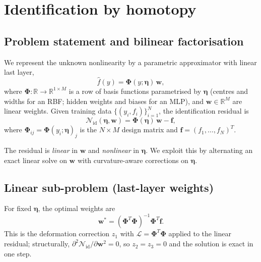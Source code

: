 \documentclass[preprint,12pt,numbers]{elsarticle}
\begin{document}
\section{Identification by homotopy}
\label{sec:identification}

\subsection{Problem statement and bilinear factorisation}

We represent the unknown nonlinearity by a parametric approximator with
linear last layer,
\begin{equation}
\hat{f}(y) = \boldsymbol{\Phi}(y;\boldsymbol{\eta})\,\mathbf{w},
\label{eq:bilinear}
\end{equation}
where $\boldsymbol{\Phi}: \mathbb{R} \to \mathbb{R}^{1\times M}$ is a row of
basis functions parametrised by $\boldsymbol{\eta}$ (centres and widths
for an RBF; hidden weights and biases for an MLP), and
$\mathbf{w} \in \mathbb{R}^M$ are linear weights. Given training data
$\{(y_i, f_i)\}_{i=1}^N$, the identification residual is
\begin{equation}
\mathcal{N}_{\mathrm{id}}(\boldsymbol{\eta}, \mathbf{w}) =
\boldsymbol{\Phi}(\boldsymbol{\eta})\,\mathbf{w} - \mathbf{f},
\label{eq:Nid}
\end{equation}
where $\boldsymbol{\Phi}_{ij} = \boldsymbol{\Phi}(y_i;\boldsymbol{\eta})_j$
is the $N \times M$ design matrix and
$\mathbf{f} = (f_1, \ldots, f_N)^T$.

The residual is \emph{linear} in $\mathbf{w}$ and \emph{nonlinear} in
$\boldsymbol{\eta}$. We exploit this by alternating an exact linear solve
on $\mathbf{w}$ with curvature-aware corrections on $\boldsymbol{\eta}$.

\subsection{Linear sub-problem (last-layer weights)}

For fixed $\boldsymbol{\eta}$, the optimal weights are
\begin{equation}
\mathbf{w}^* = (\boldsymbol{\Phi}^T\boldsymbol{\Phi})^{-1}\boldsymbol{\Phi}^T\mathbf{f}.
\label{eq:ls}
\end{equation}
This is the deformation correction $z_1$ with $\mathcal{L} = \boldsymbol{\Phi}^T\boldsymbol{\Phi}$
applied to the linear residual; structurally,
$\partial^2\mathcal{N}_{\mathrm{id}}/\partial\mathbf{w}^2 = 0$, so
$z_2 = z_3 = 0$ and the solution is exact in one step.
\end{document}
